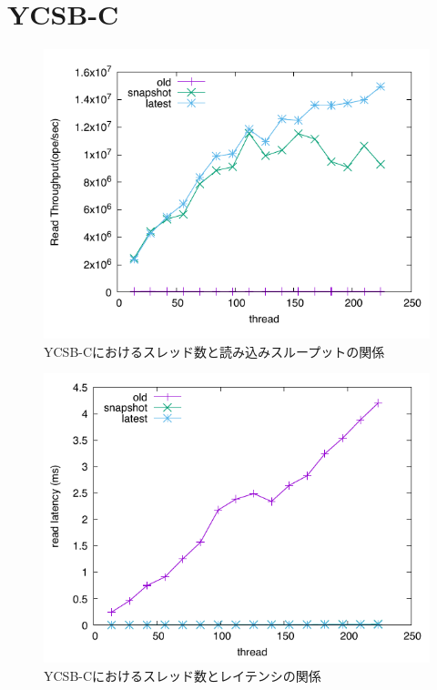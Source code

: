 \documentclass[a4paper]{jreport}	%
\begin{document}

\section{YCSB-C}

\begin{figure}[h] 
\centering
\includegraphics[width=15cm]{ycsb-c/opposite-read-throughput}
\caption{YCSB-Cにおけるスレッド数と読み込みスループットの関係}
\label{fig:throughput-c}
\end{figure}

\begin{figure}[h] 
\centering
\includegraphics[width=15cm]{ycsb-c/opposite-read-latency}
\caption{YCSB-Cにおけるスレッド数とレイテンシの関係}
\label{fig:latency-c}
\end{figure}
\end{document}
